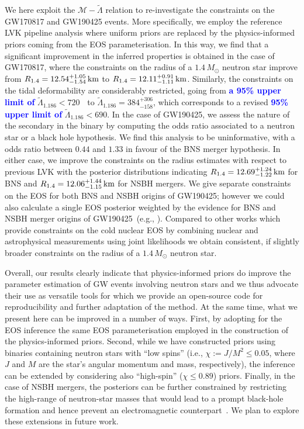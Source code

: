 \documentclass[twocolumn,linenumbers]{aastex631}
\newcommand{\blue}[1]{\textcolor{blue}{\textbf{#1}}}
\begin{document}
We here exploit the $\mathcal{M}\!- \!\tilde{\Lambda}$ relation to
re-investigate the constraints on the GW170817 and GW190425 events. More
specifically, we employ the reference LVK pipeline analysis where uniform
priors are replaced by the physics-informed priors coming from the EOS
parameterisation. In this way, we find that a significant improvement in
the inferred properties is obtained in the case of GW170817, where the
constraints on the radius of a $1.4 \, M_\odot$ neutron star improve from
$R_{1.4} = {12.54^{+1.05}_{-1.54}} \, {\rm km}$ to $R_{1.4} =
12.11^{+0.91}_{-1.11} \, {\rm km}$.  Similarly, the constraints on the
tidal deformability are considerably restricted, going from \blue{a 95\% upper limit of}
$\tilde{\Lambda}_{1.186} < 720$\blue{~\citep{abbott19_170817Properties}} to $\tilde{\Lambda}_{1.186} =
384^{+306}_{-158}$, which corresponds to a revised \blue{95\% upper limit of} $\tilde{\Lambda}_{1.186}<690$.  In the case of GW190425, we assess the
nature of the secondary in the binary by computing the odds ratio
associated to a neutron star or a black hole hypothesis.  We find this
analysis to be uninformative, with a odds ratio between $0.44$ and $1.33$
in favour of the BNS merger hypothesis.  In either case, we improve the
constraints on the radius estimates with respect to previous LVK with the
posterior distributions indicating $R_{1.4} = 12.69^{+1.24}_{-1.22} \,
{\rm km}$ for BNS and $R_{1.4} = 12.06^{+1.44}_{-1.15} \, {\rm km}$ for
NSBH mergers. We give separate constraints on the EOS for both BNS and
NSBH origins of GW190425; however we could also calculate a single EOS
posterior weighted by the evidence for BNS and NSBH merger origins of
GW190425~(e.g., \citealt{2020Ashton}). Compared to other works which
provide constraints on the cold nuclear EOS by combining nuclear and
astrophysical measurements using joint likelihoods
\citep[e.g.,][]{2019Coughlin, 2020Dietrich, 2023Tiwari, 2023Pang,
  2024Breschi, 2025Koehn, 2025Golomb} we obtain consistent, if slightly
broader constraints on the radius of a $1.4 \, M_\odot$ neutron star.

Overall, our results clearly indicate that physics-informed priors do
improve the parameter estimation of GW events involving neutron stars and
we thus advocate their use as versatile tools for which we provide an
open-source code for reproducibility and further adaptation of the
method. At the same time, what we present here can be improved in a
number of ways. First, by adopting for the EOS inference the same EOS
parameterisation employed in the construction of the physics-informed
priors. Second, while we have constructed priors using binaries
containing neutron stars with ``low spins'' (i.e., $\chi:=J/M^2 \leq
0.05$, where $J$ and $M$ are the star's angular momentum and mass,
respectively), the inference can be extended by considering also
``high-spin'' ($\chi \leq 0.89$) priors. Finally, in the case of NSBH
mergers, the posteriors can be further constrained by restricting the
high-range of neutron-star masses that would lead to a prompt black-hole
formation and hence prevent an electromagnetic
counterpart~\citep{Bauswein2013, Koeppel2019, Tootle2021,
  Kashyap:2021wzs, Koelsch2021, Ecker:2024kzs}.  We plan to explore these
extensions in future work.
\end{document}
